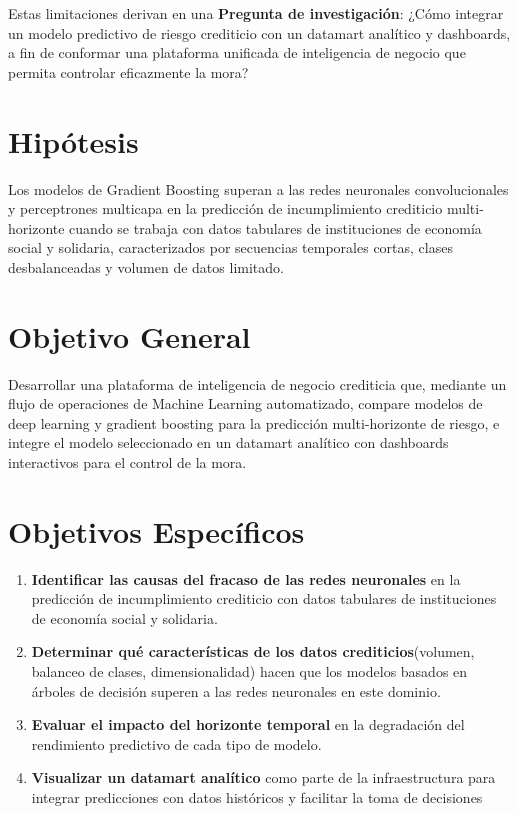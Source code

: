 Estas limitaciones derivan en una  \textbf{Pregunta de investigación}: ¿Cómo integrar un modelo predictivo de riesgo crediticio con un datamart analítico y dashboards, a fin de conformar una plataforma unificada de inteligencia de negocio que permita controlar eficazmente la mora?

\section{Hipótesis}

Los modelos de Gradient Boosting superan a las redes neuronales convolucionales y perceptrones multicapa en la predicción de incumplimiento crediticio multi-horizonte cuando se trabaja con datos tabulares de instituciones de economía social y solidaria, caracterizados por secuencias temporales cortas, clases desbalanceadas y volumen de datos limitado.

\section{Objetivo General}

Desarrollar una plataforma de inteligencia de negocio crediticia que, mediante un flujo de operaciones de Machine Learning automatizado, compare modelos de deep learning y gradient boosting para la predicción multi-horizonte de riesgo, e integre el modelo seleccionado en un datamart analítico con dashboards interactivos para el control de la mora.

\section{Objetivos Específicos}

\begin{enumerate}
    \item  \textbf{Identificar las causas del fracaso de las redes neuronales} en la predicción de incumplimiento crediticio con datos tabulares de instituciones de economía social y solidaria.
    \item \textbf{Determinar qué características de los datos crediticios}(volumen, balanceo de clases, dimensionalidad) hacen que los modelos basados en árboles de decisión superen a las redes neuronales en este dominio.
    \item \textbf{Evaluar el impacto del horizonte temporal} en la degradación del rendimiento predictivo de cada tipo de modelo.
    \item \textbf{Visualizar un datamart analítico} como parte de la infraestructura para integrar predicciones con datos históricos y facilitar la toma de decisiones    
\end{enumerate}

